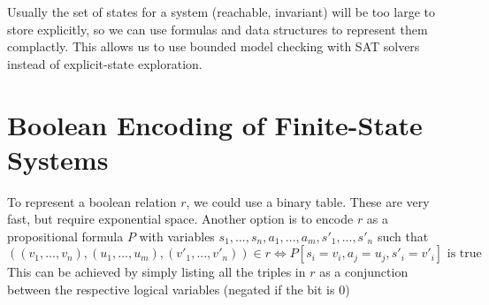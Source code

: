 \thm{}{
  \[
  \mathit{Reach}(M) = \overline{r}^*[I] 
  \]
}

\thm{}{
  \[
    \bigcup_{n \geq 0} \mathit{post}^n(X) = \mathit{Reach}(M)
  \]
}


Usually the set of states for a system (reachable, invariant) will be too large to store explicitly, so we can use formulas and data structures to represent them complactly. This allows us to use bounded model checking with SAT solvers instead of explicit-state exploration.

\section{Boolean Encoding of Finite-State Systems}

To represent a boolean relation $ r $, we could use a binary table. These are very fast, but require exponential space. Another option is to encode $ r $ as a propositional formula $ P $ with variables $ s_1,...,s_n, a_1,...,a_m, s'_1,...,s'_n $ such that
\[
  ((v_1,...,v_n),(u_1,...,u_m),(v'_1,...,v'_n)) \in r \iff P[s_i = v_i, a_j = u_j, s'_i = v'_i] \text{ is true}
\]
This can be achieved by simply listing all the triples in $ r $ as a conjunction between the respective logical variables (negated if the bit is 0)

